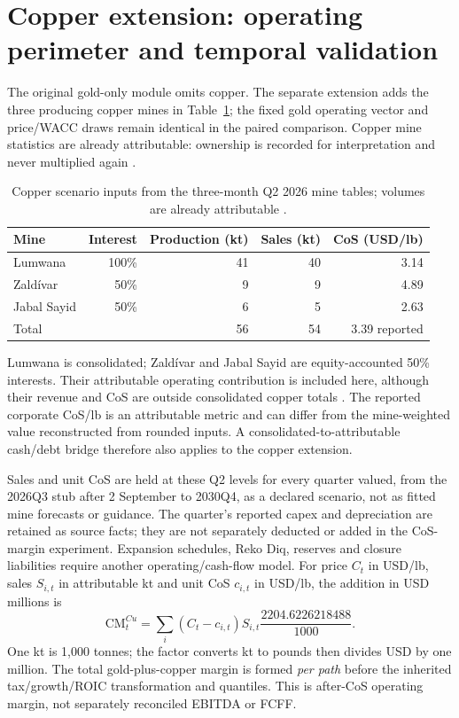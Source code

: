 \clearpage
\section{Copper extension: operating perimeter and temporal validation}
\label{sec:copper-extension}

The original gold-only module omits copper. The separate extension adds the
three producing copper mines in Table~\ref{tab:copper-operating-perimeter};
the fixed gold operating vector and price/WACC draws remain identical in
the paired comparison. Copper mine statistics are already attributable:
ownership is recorded for interpretation and never multiplied again
\cite{barrick-mine-stats-2026}.

\begin{table}[H]
\centering\small
\caption{Copper scenario inputs from the three-month Q2 2026 mine tables;
volumes are already attributable \cite{barrick-mine-stats-2026}.}
\label{tab:copper-operating-perimeter}
\begin{tabularx}{\textwidth}{@{}Xrrrr@{}}
\toprule
Mine & Interest & Production (kt) & Sales (kt) & CoS (USD/lb) \\
\midrule
Lumwana & 100\% & 41 & 40 & 3.14 \\
Zald\'ivar & 50\% & 9 & 9 & 4.89 \\
Jabal Sayid & 50\% & 6 & 5 & 2.63 \\
\midrule
Total & & 56 & 54 & 3.39 reported \\
\bottomrule
\end{tabularx}
\end{table}

Lumwana is consolidated; Zald\'ivar and Jabal Sayid are equity-accounted
50\% interests. Their attributable operating contribution is included here,
although their revenue and CoS are outside consolidated copper totals
\cite{barrick-ar-2025}. The reported corporate CoS/lb is an attributable
metric and can differ from the mine-weighted value reconstructed from rounded
inputs. A consolidated-to-attributable cash/debt bridge therefore also applies
to the copper extension.

Sales and unit CoS are held at these Q2 levels for every quarter valued, from
the 2026Q3 stub after 2 September to 2030Q4, as a declared scenario, not as
fitted mine forecasts or guidance. The quarter's reported
capex and depreciation are retained as source facts; they are not separately
deducted or added in the CoS-margin experiment. Expansion schedules, Reko Diq,
reserves and closure liabilities require another operating/cash-flow model.
For price $C_t$ in USD/lb, sales $S_{i,t}$ in attributable kt and unit CoS
$c_{i,t}$ in USD/lb, the addition in USD millions is
\begin{equation}
\mathrm{CM}^{Cu}_t=\sum_i(C_t-c_{i,t})S_{i,t}
\frac{2204.6226218488}{1000}.
\label{eq:copper-margin}
\end{equation}
One kt is 1,000 tonnes; the factor converts kt to pounds then divides USD by
one million. The total gold-plus-copper margin is formed \emph{per path}
before the inherited tax/growth/ROIC transformation and quantiles. This is
after-CoS operating margin, not separately reconciled EBITDA or FCFF.

